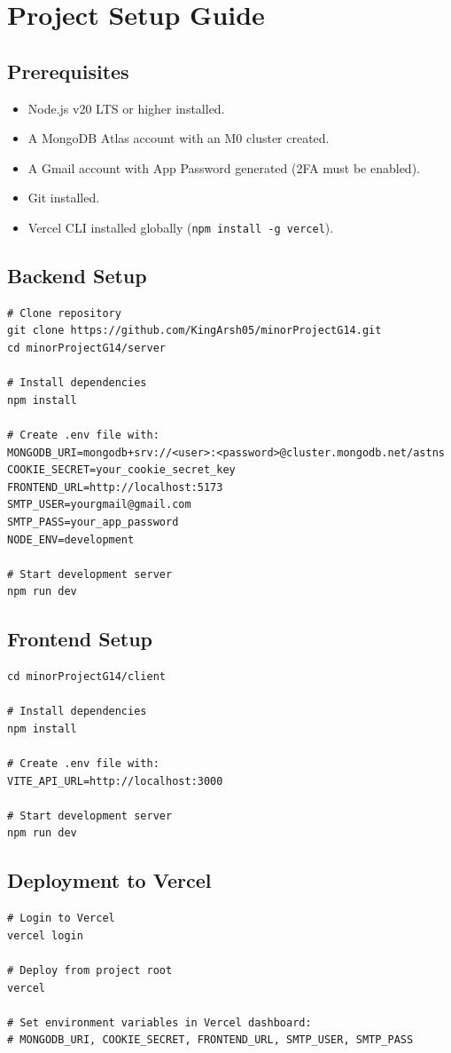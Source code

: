 \documentclass[12pt,a4paper]{report}
\begin{document}
\appendix
\chapter{Project Setup Guide}

\section{Prerequisites}
\begin{itemize}
  \item Node.js v20 LTS or higher installed.
  \item A MongoDB Atlas account with an M0 cluster created.
  \item A Gmail account with App Password generated (2FA must be enabled).
  \item Git installed.
  \item Vercel CLI installed globally (\texttt{npm install -g vercel}).
\end{itemize}

\section{Backend Setup}
\begin{verbatim}
# Clone repository
git clone https://github.com/KingArsh05/minorProjectG14.git
cd minorProjectG14/server

# Install dependencies
npm install

# Create .env file with:
MONGODB_URI=mongodb+srv://<user>:<password>@cluster.mongodb.net/astns
COOKIE_SECRET=your_cookie_secret_key
FRONTEND_URL=http://localhost:5173
SMTP_USER=yourgmail@gmail.com
SMTP_PASS=your_app_password
NODE_ENV=development

# Start development server
npm run dev
\end{verbatim}

\section{Frontend Setup}
\begin{verbatim}
cd minorProjectG14/client

# Install dependencies
npm install

# Create .env file with:
VITE_API_URL=http://localhost:3000

# Start development server
npm run dev
\end{verbatim}

\section{Deployment to Vercel}
\begin{verbatim}
# Login to Vercel
vercel login

# Deploy from project root
vercel

# Set environment variables in Vercel dashboard:
# MONGODB_URI, COOKIE_SECRET, FRONTEND_URL, SMTP_USER, SMTP_PASS
\end{verbatim}
\end{document}
